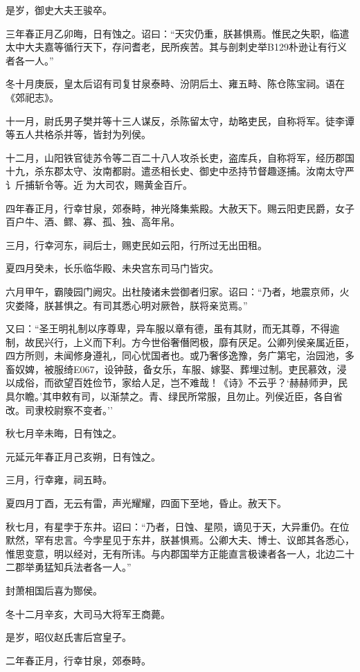 \documentclass[]{article}
\begin{document}
是岁，御史大夫王骏卒。

三年春正月乙卯晦，日有蚀之。诏曰：``天灾仍重，朕甚惧焉。惟民之失职，临遣太中大夫嘉等循行天下，存问耆老，民所疾苦。其与剖刺史举B129朴逊让有行义者各一人。''

冬十月庚辰，皇太后诏有司复甘泉泰畤、汾阴后土、雍五畤、陈仓陈宝祠。语在《郊祀志》。

十一月，尉氏男子樊并等十三人谋反，杀陈留太守，劫略吏民，自称将军。徒李谭等五人共格杀并等，皆封为列侯。

十二月，山阳铁官徒苏令等二百二十八人攻杀长吏，盗库兵，自称将军，经历郡国十九，杀东郡太守、汝南都尉。遣丞相长史、御史中丞持节督趣逐捕。汝南太守严讠斤捕斩令等。近为大司农，赐黄金百斤。

四年春正月，行幸甘泉，郊泰畤，神光降集紫殿。大赦天下。赐云阳吏民爵，女子百户牛、酒、鳏、寡、孤、独、高年帛。

三月，行幸河东，祠后士，赐吏民如云阳，行所过无出田租。

夏四月癸未，长乐临华殿、未央宫东司马门皆灾。

六月甲午，霸陵园门阙灾。出杜陵诸未尝御者归家。诏曰：``乃者，地震京师，火灾娄降，朕甚惧之。有司其悉心明对厥咎，朕将亲览焉。''

又曰：``圣王明礼制以序尊卑，异车服以章有德，虽有其财，而无其尊，不得逾制，故民兴行，上义而下利。方今世俗奢僭罔极，靡有厌足。公卿列侯亲属近臣，四方所则，未闻修身遵礼，同心忧国者也。或乃奢侈逸豫，务广第宅，治园池，多畜奴婢，被服绮E067，设钟鼓，备女乐，车服、嫁娶、葬埋过制。吏民慕效，浸以成俗，而欲望百姓俭节，家给人足，岂不难哉！《诗》不云乎？`赫赫师尹，民具尔瞻。'其申敕有司，以渐禁之。青、绿民所常服，且勿止。列侯近臣，各自省改。司隶校尉察不变者。''

秋七月辛未晦，日有蚀之。

元延元年春正月己亥朔，日有蚀之。

三月，行幸雍，祠五畤。

夏四月丁酉，无云有雷，声光耀耀，四面下至地，昏止。赦天下。

秋七月，有星孛于东井。诏曰：``乃者，日蚀、星陨，谪见于天，大异重仍。在位默然，罕有忠言。今孛星见于东井，朕甚惧焉。公卿大夫、博士、议郎其各悉心，惟思变意，明以经对，无有所讳。与内郡国举方正能直言极谏者各一人，北边二十二郡举勇猛知兵法者各一人。''

封萧相国后喜为酂侯。

冬十二月辛亥，大司马大将军王商薨。

是岁，昭仪赵氏害后宫皇子。

二年春正月，行幸甘泉，郊泰畤。
\end{document}
